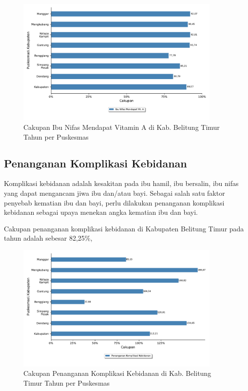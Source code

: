 \begin{figure}[H]
    \centering{}
    \includegraphics[width=0.9\textwidth]{bab_05/bab_05_05d_nifasVitA}
    \caption{Cakupan Ibu Nifas Mendapat Vitamin A di Kab. Belitung Timur Tahun \tP per Puskesmas}
    \label{fig:Cakupan-Nifas-VitA}
\end{figure}

\subsection{Penanganan Komplikasi Kebidanan}
Komplikasi kebidanan adalah kesakitan pada ibu hamil, ibu bersalin, ibu nifas yang dapat mengancam jiwa ibu dan/atau bayi. Sebagai salah satu faktor penyebab kematian ibu dan bayi, perlu dilakukan penanganan komplikasi kebidanan sebagai upaya menekan angka kematian ibu dan bayi.

Cakupan penanganan komplikasi kebidanan di Kabupaten Belitung Timur pada tahun \tP adalah sebesar 82,25\%,

\begin{figure}[H]
    \centering
    \includegraphics[width=0.9\textwidth]{bab_05/bab_05_05e_komplikasiKebidanan}
    \caption{Cakupan Penanganan Komplikasi Kebidanan di Kab. Belitung Timur Tahun \tP per Puskesmas}
    \label{fig:Cakupan-Komplikasi-Kebidanan}
\end{figure}


